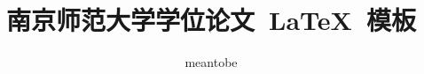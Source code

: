 \documentclass[master]{njnuthesis}
\begin{document}

  \serialnumber{} %
  \confidential{} %
  \title{南京师范大学学位论文~\LaTeX{}~模板} %
  \author{meantobe} %
  \submitdate{\today} %
  
  \maketitle

\frontmatter
  \tableofcontents
  \listoffigures
  \listoftables

  
\mainmatter
  

\end{document}
